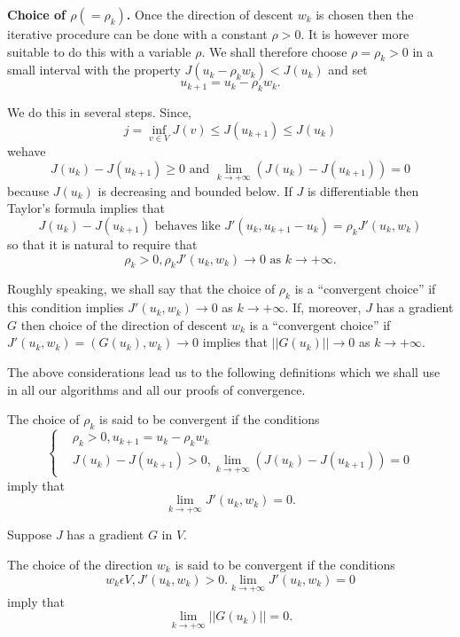 \medskip
\noindent
{\bf Choice of $\rho (= \rho_{k})$.} Once the direction of descent $w_{k}$ is chosen then the iterative procedure can be done with a constant $\rho > 0$. It is however more suitable to do this with a variable $\rho$. We shall therefore choose $\rho = \rho_{k} > 0$ in a small interval with the property $J(u_{k} - \rho_{k} w_{k}) < J(u_{k})$ and set
$$
u_{k+1} = u_{k} - \rho_{k} w_{k}.
$$

We do this in several steps. Since,
$$
j = \inf\limits_{v \in V} J(v) \leq J(u_{k+1}) \leq J(u_{k})
$$
we\pageoriginale have
$$
J(u_{k}) - J(u_{k+1}) \geq 0 \text{ and } \lim_{k \to +\infty} (J(u_{k}) - J(u_{k+1})) = 0
$$
because $J(u_{k})$ is decreasing and bounded below. If $J$ is differentiable then Taylor's formula implies that
$$
J(u_{k}) - J(u_{k+1}) \text{ behaves like } J'(u_{k}, u_{k+1} - u_{k}) = \rho_{k} J'(u_{k}, w_{k})
$$
so that it is natural to require that
$$
\rho_{k} > 0, \rho_{k} J'(u_{k}, w_{k}) \to 0 \text{ as } k \to + \infty.
$$

Roughly speaking, we shall say that the choice of $\rho_{k}$ is a ``convergent choice'' if this condition implies $J'(u_{k}, w_{k}) \to 0$ as $k \to + \infty$. If, moreover, $J$ has a gradient $G$ then choice of the direction of descent $w_{k}$ is a ``convergent choice'' if $J'(u_{k}, w_{k}) = (G(u_{k}), w_{k}) \to 0$ implies that $||G(u_{k})|| \to 0$ as $k \to + \infty$.

The above considerations lead us to the following definitions which we shall use in all our algorithms and all our proofs of convergence. 

\begin{definition}\label{chap3-def1.1}
The choice of $\rho_{k}$ is said to be convergent if the conditions
\begin{equation*}
\begin{cases}
& \rho_{k} > 0, u_{k+1} = u_{k}-\rho_{k} w_{k}\\
& J(u_{k}) - J(u_{k+1}) > 0, \lim_{k \to +\infty} (J(u_{k}) - J(u_{k+1})) = 0
\end{cases}
\end{equation*}
imply that
$$
\lim_{k \to +\infty} J'(u_{k}, w_{k}) = 0.
$$

Suppose $J$ has a gradient $G$ in $V$.
\end{definition}

\begin{definition}\label{chap3-def1.2}
The choice of the direction $w_{k}$ is said to be convergent if the conditions
$$
w_{k} \epsilon V, J'(u_{k}, w_{k}) > 0. \lim_{k \to + \infty} J'(u_{k}, w_{k}) = 0
$$\pageoriginale
imply that
$$
\lim_{k \to + \infty} ||G(u_{k})|| = 0.
$$
\end{definition}

